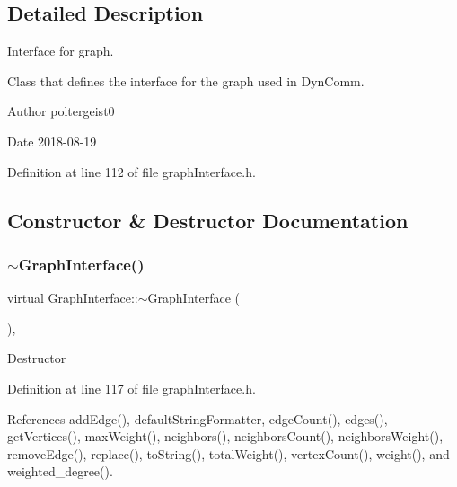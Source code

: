 \subsection{Detailed Description}
Interface for graph. 

Class that defines the interface for the graph used in Dyn\+Comm.

\begin{DoxyAuthor}{Author}
poltergeist0
\end{DoxyAuthor}
\begin{DoxyDate}{Date}
2018-\/08-\/19 
\end{DoxyDate}


Definition at line 112 of file graph\+Interface.\+h.



\subsection{Constructor \& Destructor Documentation}
\mbox{\label{classGraphInterface_a5f708904a9469c548d85a6788a245340}} 
\subsubsection{\texorpdfstring{$\sim$\+Graph\+Interface()}{~GraphInterface()}}
{\footnotesize\ttfamily virtual Graph\+Interface\+::$\sim$\+Graph\+Interface (\begin{DoxyParamCaption}{ }\end{DoxyParamCaption})\hspace{0.3cm}{\ttfamily [inline]}, {\ttfamily [virtual]}}

Destructor 

Definition at line 117 of file graph\+Interface.\+h.



References add\+Edge(), default\+String\+Formatter, edge\+Count(), edges(), get\+Vertices(), max\+Weight(), neighbors(), neighbors\+Count(), neighbors\+Weight(), remove\+Edge(), replace(), to\+String(), total\+Weight(), vertex\+Count(), weight(), and weighted\+\_\+degree().

